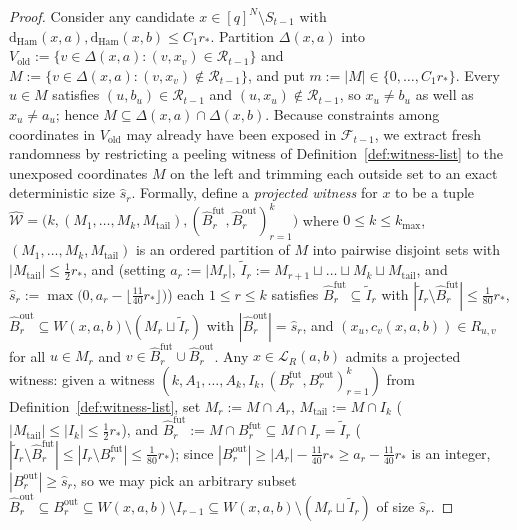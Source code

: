 \documentclass[11pt]{article}
\theoremstyle{definition}
\theoremstyle{remark}
\newcommand{\Ham}{\mathrm{Ham}}
\newcommand{\dHam}{\mathrm{d}_{\Ham}}
\begin{document}
\begin{proof}
Consider any candidate $x \in [q]^N \setminus S_{t-1}$ with $\dHam(x, a), \dHam(x, b) \le C_1 r_*$. Partition $\Delta(x, a)$ into $V_{\mathrm{old}} := \{v \in \Delta(x, a) : (v, x_v) \in \mathcal{R}_{t-1}\}$ and $M := \{v \in \Delta(x, a) : (v, x_v) \notin \mathcal{R}_{t-1}\}$, and put $m := |M| \in \{0, \dots, C_1 r_*\}$. Every $u \in M$ satisfies $(u, b_u) \in \mathcal{R}_{t-1}$ and $(u, x_u) \notin \mathcal{R}_{t-1}$, so $x_u \ne b_u$ as well as $x_u \ne a_u$; hence $M \subseteq \Delta(x, a) \cap \Delta(x, b)$. Because constraints among coordinates in $V_{\mathrm{old}}$ may already have been exposed in $\mathcal{F}_{t-1}$, we extract fresh randomness by restricting a peeling witness of Definition~\ref{def:witness-list} to the unexposed coordinates $M$ on the left and trimming each outside set to an exact deterministic size $\hat{s}_r$. Formally, define a \emph{projected witness} for $x$ to be a tuple $\widehat{\mathcal{W}} = \bigl(k, (M_1, \dots, M_k, M_{\mathrm{tail}}), (\widehat{B}_r^{\mathrm{fut}}, \widehat{B}_r^{\mathrm{out}})_{r=1}^k\bigr)$ where $0 \le k \le k_{\max}$, $(M_1, \dots, M_k, M_{\mathrm{tail}})$ is an ordered partition of $M$ into pairwise disjoint sets with $|M_{\mathrm{tail}}| \le \frac{1}{2} r_*$, and (setting $a_r := |M_r|$, $\widetilde{I}_r := M_{r+1} \sqcup \dots \sqcup M_k \sqcup M_{\mathrm{tail}}$, and $\hat{s}_r := \max\bigl(0, a_r - \lfloor \frac{11}{40} r_* \rfloor\bigr)$) each $1 \le r \le k$ satisfies $\widehat{B}_r^{\mathrm{fut}} \subseteq \widetilde{I}_r$ with $|\widetilde{I}_r \setminus \widehat{B}_r^{\mathrm{fut}}| \le \frac{1}{80} r_*$, $\widehat{B}_r^{\mathrm{out}} \subseteq W(x, a, b) \setminus (M_r \sqcup \widetilde{I}_r)$ with $|\widehat{B}_r^{\mathrm{out}}| = \hat{s}_r$, and $(x_u, c_v(x, a, b)) \in R_{u, v}$ for all $u \in M_r$ and $v \in \widehat{B}_r^{\mathrm{fut}} \cup \widehat{B}_r^{\mathrm{out}}$. Any $x \in \mathcal{L}_R(a, b)$ admits a projected witness: given a witness $(k, A_1, \dots, A_k, I_k, (B_r^{\mathrm{fut}}, B_r^{\mathrm{out}})_{r=1}^k)$ from Definition~\ref{def:witness-list}, set $M_r := M \cap A_r$, $M_{\mathrm{tail}} := M \cap I_k$ ($|M_{\mathrm{tail}}| \le |I_k| \le \frac{1}{2} r_*$), and $\widehat{B}_r^{\mathrm{fut}} := M \cap B_r^{\mathrm{fut}} \subseteq M \cap I_r = \widetilde{I}_r$ ($|\widetilde{I}_r \setminus \widehat{B}_r^{\mathrm{fut}}| \le |I_r \setminus B_r^{\mathrm{fut}}| \le \frac{1}{80} r_*$); since $|B_r^{\mathrm{out}}| \ge |A_r| - \frac{11}{40} r_* \ge a_r - \frac{11}{40} r_*$ is an integer, $|B_r^{\mathrm{out}}| \ge \hat{s}_r$, so we may pick an arbitrary subset $\widehat{B}_r^{\mathrm{out}} \subseteq B_r^{\mathrm{out}} \subseteq W(x, a, b) \setminus I_{r-1} \subseteq W(x, a, b) \setminus (M_r \sqcup \widetilde{I}_r)$ of size $\hat{s}_r$.


\end{proof}
\end{document}
